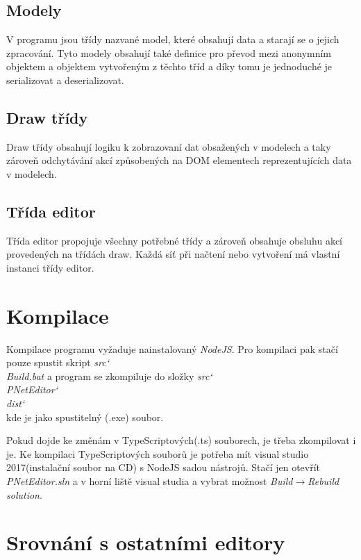 \documentclass[
  biblatex,
  glossaries,
]{kidiplom}
\begin{document}
\subsection{Modely}

V programu jsou třídy nazvané model, které obsahují data a 
starají se o jejich zpracování.
Tyto modely obsahují také definice pro 
převod mezi anonymním objektem a objektem 
vytvořeným z těchto tříd a díky tomu je 
jednoduché je serializovat a deserializovat.


\subsection{Draw třídy}

Draw třídy obsahují logiku k zobrazovaní dat obsažených v modelech a taky
zároveň odchytávání akcí způsobených na DOM elementech reprezentujících 
data v modelech.


\subsection{Třída editor}

Třída editor propojuje všechny potřebné třídy a zároveň obsahuje obsluhu 
akcí provedených na třídách draw. Každá síť při načtení nebo vytvoření 
má vlastní instanci třídy editor.




\section{Kompilace}

Kompilace programu vyžaduje nainstalovaný \textit{NodeJS}. Pro kompilaci pak
stačí pouze spustit skript \textit{src\char`\\Build.bat} a program se zkompiluje do složky 
\textit{src\char`\\PNetEditor\char`\\dist\char`\\} kde je jako spustitelný (.exe) soubor.

Pokud dojde ke změnám v TypeScriptových(.ts) souborech, je třeba zkompilovat i je.
Ke kompilaci TypeScriptových souborů je potřeba mít visual studio 2017(instalační soubor na CD)
s NodeJS sadou nástrojů. Stačí jen otevřít \\
\textit{PNetEditor.sln} a v horní liště 
visual studia a vybrat možnost \textit{Build$\to$Rebuild solution}.




\section{Srovnání s ostatními editory}
\end{document}
